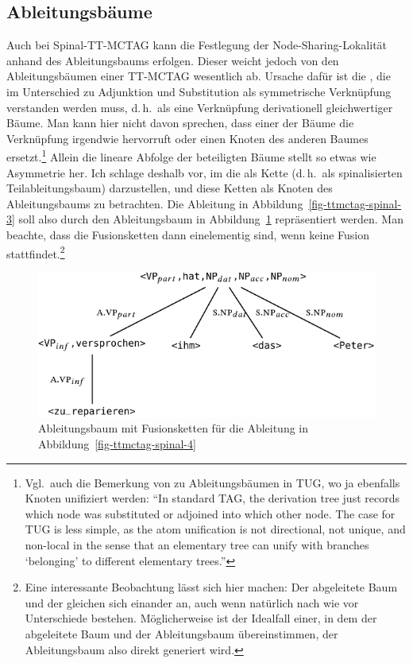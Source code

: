 \subsection{Ableitungsbäume}

Auch bei Spinal-TT-MCTAG kann die Festlegung der Node-Sharing-Loka\-li\-tät anhand des Ableitungsbaums erfolgen. Dieser weicht jedoch von den Ableitungsbäumen einer TT-MC\-TAG wesentlich ab. Ursache dafür ist die , die im Unterschied zu Adjunktion und Substitution als symmetrische Verknüpfung verstanden werden muss, d.\,h.\ als eine Verknüpfung derivationell gleichwertiger Bäume. Man kann hier nicht davon sprechen, dass einer der Bäume die Verknüpfung irgendwie hervorruft oder einen Knoten des anderen Baumes ersetzt.\footnote{Vgl.\ auch die Bemerkung von \citet[21]{Gerdes:04} zu Ableitungsbäumen in TUG, wo ja ebenfalls Knoten unifiziert werden: "`In  standard TAG, the derivation tree just records which node was substituted or adjoined into which other node. The case for TUG is less simple, as the atom unification is not directional, not unique, and non-local in the sense that an elementary tree can unify with branches `belonging' to different elementary trees."' } Allein die lineare Abfolge der beteiligten Bäume stellt so etwas wie Asymmetrie her. Ich schlage deshalb vor, im  die  als Kette (d.\,h.\ als spinalisierten Teilableitungsbaum) darzustellen, und diese Ketten als Knoten des Ableitungsbaums zu betrachten. Die Ableitung in Abbildung~\ref{fig-ttmctag-spinal-3} soll also durch den Ableitungsbaum in Abbildung~\ref{fig-ttmctag-spinal-5} repräsentiert werden. Man beachte, dass die Fusionsketten dann einelementig sind, wenn keine Fusion stattfindet.\footnote{Eine interessante Beobachtung lässt sich hier machen: Der abgeleitete Baum und der  gleichen sich einander an, auch wenn natürlich nach wie vor Unterschiede bestehen. Möglicherweise ist der Idealfall einer, in dem der abgeleitete Baum und der Ableitungsbaum übereinstimmen, der Ableitungsbaum also direkt generiert wird.} 
\begin{figure}[t]
\centering
\includegraphics{graphics/abb748.pdf}
\caption{\label{fig-ttmctag-spinal-5}Ableitungsbaum mit Fusionsketten für die Ableitung in Abbildung~\ref{fig-ttmctag-spinal-4}}
\end{figure}

